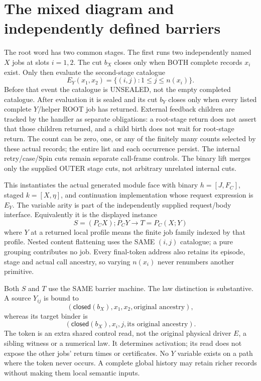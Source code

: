 \documentclass{article}
\begin{document}
\section{The mixed diagram and independently defined barriers}
The root word has two common stages. The first runs two independently named $X$ jobs at slots $i=1,2$. The cut $b_X$ closes only when BOTH complete records $x_i$ exist. Only then evaluate the second-stage catalogue
\[
 E_Y(x_1,x_2)=\{(i,j):1\leq j\leq n(x_i)\}.
\]
Before that event the catalogue is UNSEALED, not the empty completed catalogue. After evaluation it is sealed and its cut $b_Y$ closes only when every listed complete $Y$/helper ROOT job has returned. External feedback children are tracked by the handler as separate obligations: a root-stage return does not assert that those children returned, and a child birth does not wait for root-stage return. The count can be zero, one, or any of the finitely many counts selected by these actual records; the entire list and each occurrence persist. The internal retry/case/Spin cuts remain separate call-frame controls. The binary lift merges only the supplied OUTER stage cuts, not arbitrary unrelated internal cuts.

This instantiates the actual generated module face with binary $h=[J,F_C]$, staged $k=[X,\eta]$, and continuation implementation whose request expression is $E_Y$. The variable arity is part of the independently supplied request/body interface. Equivalently it is the displayed instance
\[
 S=(P_CX);P_CY\longrightarrow T=P_C(X;Y)
\]
where $Y$ at a returned local profile means the finite job family indexed by that profile. Nested content flattening uses the SAME $(i,j)$ catalogue; a pure grouping contributes no job. Every final-token address also retains its episode, stage and actual call ancestry, so varying $n(x_i)$ never renumbers another primitive.

Both $S$ and $T$ use the SAME barrier machine. The law distinction is substantive. A source $Y_{ij}$ is bound to
\[
 (\mathsf{closed}(b_X),x_1,x_2,\text{original ancestry}),
\]
whereas its target binder is
\[
 (\mathsf{closed}(b_X),x_i,j,\text{its original ancestry}).
\]
The token is an extra shared control read, not the original physical driver $E$, a sibling witness or a numerical law. It determines activation; its read does not expose the other jobs' return times or certificates. No $Y$ variable exists on a path where the token never occurs. A complete global history may retain richer records without making them local semantic inputs.
\end{document}
